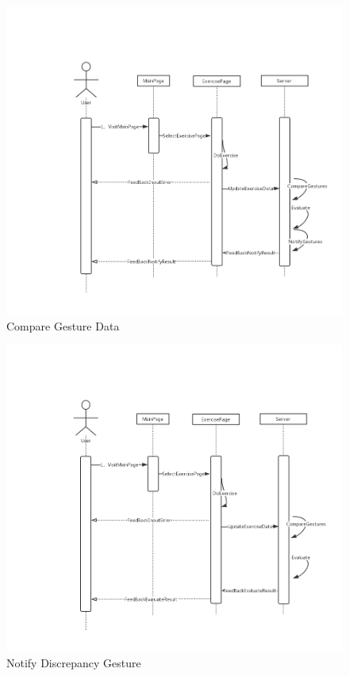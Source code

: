 \documentclass[16pt]{scrreprt}
\begin{document}
\begin{figure}[H]
    \includegraphics[width=\linewidth]{./FuncPhoto/15.png}   
    \caption{Compare Gesture Data}
\end{figure}

\begin{figure}[H]
    \includegraphics[width=\linewidth]{./FuncPhoto/16.png}   
    \caption{Notify Discrepancy Gesture }
\end{figure}
\end{document}

